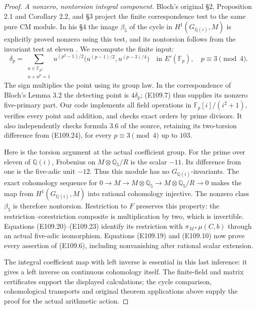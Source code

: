 \begin{proof}
\emph{A nonzero, nontorsion integral component.}
Bloch's original \S2, Proposition 2.1 and Corollary 2.2, and
\S3 project the finite correspondence test to the same pure CM
module.  In his \S4 the image $\beta_5$ of the cycle in
$H^1(G_{\mathbb Q(i)},M)$ is explicitly proved nonzero using
this test, and its nontorsion follows from the invariant test
at eleven \cite{E109_Bloch}.  We recompute the finite input:
\[
 \delta_p=\sum_{\substack{u\in\mathbb F_{p^2}\\u+u^p=1}}
 u^{(p^2-1)/2}
       \bigl(u^{(p-1)/2},u^{(p-3)/4}\bigr)
             \quad\text{in }E'(\mathbb F_p),\quad p\equiv3\pmod4.
 \tag{E109.24}
\]
The sign multiplies the point using its group law.  In the
correspondence of Bloch's Lemma 3.2 the detecting point is
$4\delta_p$; (E109.7) thus supplies its nonzero five-primary
part.  Our code implements all field operations in
$\mathbb F_p[i]/(i^2+1)$, verifies every point and addition,
and checks exact orders by prime divisors.  It also independently
checks formula 3.6 of the source, retaining its two-torsion
difference from (E109.24), for every $p\equiv3\pmod4$ up to $103$.

Here is the torsion argument at the actual coefficient group.
For the prime over eleven of $\mathbb Q(i)$, Frobenius on
$M\otimes\mathbb Q_5/R$ is the scalar $-11$.
Its difference from one is the five-adic unit $-12$.
Thus this module has no $G_{\mathbb Q(i)}$-invariants.
The exact cohomology sequence for
$0\to M\to M\otimes\mathbb Q_5\to M\otimes\mathbb Q_5/R\to0$
makes the map from $H^1(G_{\mathbb Q(i)},M)$ into rational
cohomology injective.  The nonzero class $\beta_5$ is therefore
nontorsion.  Restriction to $F$ preserves this property: the
restriction--corestriction composite is multiplication by two,
which is invertible.  Equations (E109.20)--(E109.23) identify
its restriction with $\pi_{M*}\mu(C,b)$ through an actual
five-adic isomorphism.  Equations (E109.19) and (E109.10)
now prove every assertion of (E109.6), including nonvanishing
after rational scalar extension.

The integral coefficient map with left inverse is essential in
this last inference: it gives a left inverse on continuous
cohomology itself.  The finite-field and matrix certificates
support the displayed calculations; the cycle comparison,
cohomological transports and original theorem applications
above supply the proof for the actual arithmetic action.
\end{proof}
